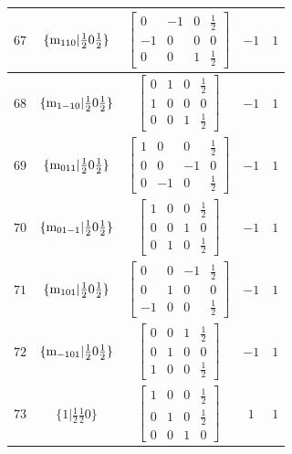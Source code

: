 \documentclass[fleqn,8pt]{jsarticle}
\begin{document}
\begin{longtable}{ccccc}
$ 67 $ & $ \{{\rm m}_{110}|\frac{1}{2} 0 \frac{1}{2}\} $ & $ \begin{bmatrix} 0 & -1 & 0 & \frac{1}{2} \\ -1 & 0 & 0 & 0 \\ 0 & 0 & 1 & \frac{1}{2} \end{bmatrix} $ & $ -1 $ & $ 1 $ \\ \hline
$ 68 $ & $ \{{\rm m}_{1-10}|\frac{1}{2} 0 \frac{1}{2}\} $ & $ \begin{bmatrix} 0 & 1 & 0 & \frac{1}{2} \\ 1 & 0 & 0 & 0 \\ 0 & 0 & 1 & \frac{1}{2} \end{bmatrix} $ & $ -1 $ & $ 1 $ \\ \hline
$ 69 $ & $ \{{\rm m}_{011}|\frac{1}{2} 0 \frac{1}{2}\} $ & $ \begin{bmatrix} 1 & 0 & 0 & \frac{1}{2} \\ 0 & 0 & -1 & 0 \\ 0 & -1 & 0 & \frac{1}{2} \end{bmatrix} $ & $ -1 $ & $ 1 $ \\ \hline
$ 70 $ & $ \{{\rm m}_{01-1}|\frac{1}{2} 0 \frac{1}{2}\} $ & $ \begin{bmatrix} 1 & 0 & 0 & \frac{1}{2} \\ 0 & 0 & 1 & 0 \\ 0 & 1 & 0 & \frac{1}{2} \end{bmatrix} $ & $ -1 $ & $ 1 $ \\ \hline
$ 71 $ & $ \{{\rm m}_{101}|\frac{1}{2} 0 \frac{1}{2}\} $ & $ \begin{bmatrix} 0 & 0 & -1 & \frac{1}{2} \\ 0 & 1 & 0 & 0 \\ -1 & 0 & 0 & \frac{1}{2} \end{bmatrix} $ & $ -1 $ & $ 1 $ \\ \hline
$ 72 $ & $ \{{\rm m}_{-101}|\frac{1}{2} 0 \frac{1}{2}\} $ & $ \begin{bmatrix} 0 & 0 & 1 & \frac{1}{2} \\ 0 & 1 & 0 & 0 \\ 1 & 0 & 0 & \frac{1}{2} \end{bmatrix} $ & $ -1 $ & $ 1 $ \\ \hline
$ 73 $ & $ \{1|\frac{1}{2} \frac{1}{2} 0\} $ & $ \begin{bmatrix} 1 & 0 & 0 & \frac{1}{2} \\ 0 & 1 & 0 & \frac{1}{2} \\ 0 & 0 & 1 & 0 \end{bmatrix} $ & $ 1 $ & $ 1 $ \\ \hline

\end{longtable}
\end{document}
